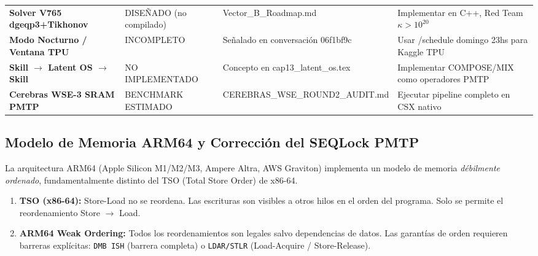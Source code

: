 \begin{longtable}{@{}p{4cm}p{3cm}p{3.5cm}p{4cm}@{}}
\textbf{Solver V765 dgeqp3+Tikhonov} &
DISEÑADO (no compilado) &
Vector\_B\_Roadmap.md &
Implementar en C++, Red Team $\kappa > 10^{20}$ \\

\textbf{Modo Nocturno / Ventana TPU} &
INCOMPLETO &
Señalado en conversación 06f1bf9c &
Usar /schedule domingo 23hs para Kaggle TPU \\

\textbf{Skill $\to$ Latent OS $\to$ Skill} &
NO IMPLEMENTADO &
Concepto en cap13\_latent\_os.tex &
Implementar COMPOSE/MIX como operadores PMTP \\

\textbf{Cerebras WSE-3 SRAM PMTP} &
BENCHMARK ESTIMADO &
CEREBRAS\_WSE\_ROUND2\_AUDIT.md &
Ejecutar pipeline completo en CSX nativo \\

\end{longtable}

\subsection{Modelo de Memoria ARM64 y Corrección del SEQLock PMTP}
\label{sec:arm_memory_model}

La arquitectura ARM64 (Apple Silicon M1/M2/M3, Ampere Altra, AWS Graviton)
implementa un modelo de memoria \emph{débilmente ordenado}, fundamentalmente
distinto del TSO (Total Store Order) de x86-64.

\begin{definition}
\label{def:memory_ordering}
\begin{enumerate}
    \item \textbf{TSO (x86-64):} Store-Load no se reordena. Las escrituras
    son visibles a otros hilos en el orden del programa. Solo se permite
    el reordenamiento Store $\to$ Load.
    
    \item \textbf{ARM64 Weak Ordering:} Todos los reordenamientos son 
    legales salvo dependencias de datos. Las garantías de orden requieren
    barreras explícitas: \texttt{DMB ISH} (barrera completa) o 
    \texttt{LDAR/STLR} (Load-Acquire / Store-Release).
\end{enumerate}
\end{definition}

